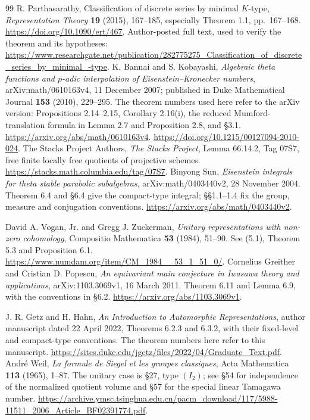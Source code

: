 \begin{thebibliography}{99}
R. Parthasarathy, Classification of discrete series by minimal $K$-type,
\emph{Representation Theory} \textbf{19} (2015), 167--185,
especially Theorem 1.1, pp.\ 167--168.
\url{https://doi.org/10.1090/ert/467}.
Author-posted full text, used to verify the theorem and its hypotheses:
\url{https://www.researchgate.net/publication/282775275_Classification_of_discrete_series_by_minimal_-type}.
K. Bannai and S. Kobayashi,
\emph{Algebraic theta functions and $p$-adic interpolation of
Eisenstein--Kronecker numbers},
arXiv:math/0610163v4, 11 December 2007;
published in Duke Mathematical Journal \textbf{153} (2010), 229--295.
The theorem numbers used here refer to the arXiv version:
Propositions 2.14--2.15, Corollary 2.16(i),
the reduced Mumford-translation formula in Lemma 2.7 and
Proposition 2.8, and \S3.1.
\url{https://arxiv.org/abs/math/0610163v4}.
\url{https://doi.org/10.1215/00127094-2010-024}.
The Stacks Project Authors,
\emph{The Stacks Project}, Lemma 66.14.2, Tag 07S7,
free finite locally free quotients of projective schemes.
\url{https://stacks.math.columbia.edu/tag/07S7}.
Binyong Sun, \emph{Eisenstein integrals for theta stable parabolic
subalgebras}, arXiv:math/0403440v2, 28 November 2004.
Theorem 6.4 and \S6.4 give the compact-type integral;
\S\S1.1--1.4 fix the group, measure and conjugation conventions.
\url{https://arxiv.org/abs/math/0403440v2}.

David A. Vogan, Jr. and Gregg J. Zuckerman,
\emph{Unitary representations with non-zero cohomology},
Compositio Mathematica \textbf{53} (1984), 51--90.
See (5.1), Theorem 5.3 and Proposition 6.1.
\url{https://www.numdam.org/item/CM_1984__53_1_51_0/}.
Cornelius Greither and Cristian D. Popescu,
\emph{An equivariant main conjecture in Iwasawa theory and applications},
arXiv:1103.3069v1, 16 March 2011.
Theorem 6.11 and Lemma 6.9, with the conventions in \S6.2.
\url{https://arxiv.org/abs/1103.3069v1}.

J. R. Getz and H. Hahn,
\emph{An Introduction to Automorphic Representations},
author manuscript dated 22 April 2022, Theorems 6.2.3
and 6.3.2, with their fixed-level and compact-type conventions.
The theorem numbers here refer to this manuscript.
\url{https://sites.duke.edu/jgetz/files/2022/04/Graduate_Text.pdf}.
Andr\'e Weil,
\emph{La formule de Siegel et les groupes classiques},
Acta Mathematica \textbf{113} (1965), 1--87.
The unitary case is \S27, type $(I_2)$; see \S54 for
independence of the normalized quotient volume and
\S57 for the special linear Tamagawa number.
\url{https://archive.ymsc.tsinghua.edu.cn/pacm_download/117/5988-11511_2006_Article_BF02391774.pdf}.


\end{thebibliography}
